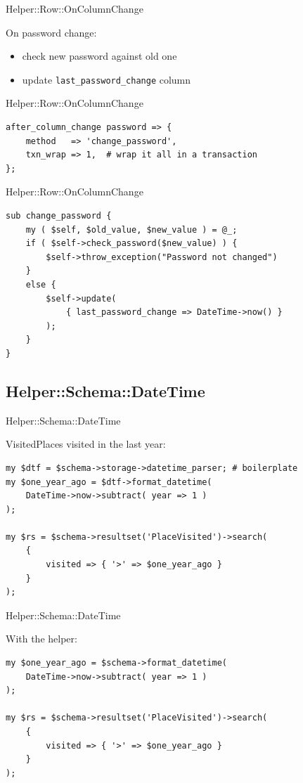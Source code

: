 \begin{frame}[fragile]{Helper::Row::OnColumnChange}

On password change:

\begin{itemize}
\item check new password against old one
\item update \verb|last_password_change| column
\end{itemize}

\end{frame}

\begin{frame}[fragile]{Helper::Row::OnColumnChange}
\begin{lstlisting}
after_column_change password => {
    method   => 'change_password',
    txn_wrap => 1,  # wrap it all in a transaction
};
\end{lstlisting}
\end{frame}

\begin{frame}[fragile]{Helper::Row::OnColumnChange}
\begin{lstlisting}
sub change_password {
    my ( $self, $old_value, $new_value ) = @_;
    if ( $self->check_password($new_value) ) {
        $self->throw_exception("Password not changed")
    }
    else {
        $self->update(
            { last_password_change => DateTime->now() }
        );
    }
}
\end{lstlisting}
\end{frame}

\subsection{Helper::Schema::DateTime}

\begin{frame}[fragile]{Helper::Schema::DateTime}

VisitedPlaces visited in the last year:

\begin{lstlisting}
my $dtf = $schema->storage->datetime_parser; # boilerplate
my $one_year_ago = $dtf->format_datetime(
    DateTime->now->subtract( year => 1 )
);

my $rs = $schema->resultset('PlaceVisited')->search(
    {
        visited => { '>' => $one_year_ago }
    }
);
\end{lstlisting}
\end{frame}

\begin{frame}[fragile]{Helper::Schema::DateTime}

With the helper:

\begin{lstlisting}
my $one_year_ago = $schema->format_datetime(
    DateTime->now->subtract( year => 1 )
);

my $rs = $schema->resultset('PlaceVisited')->search(
    {
        visited => { '>' => $one_year_ago }
    }
);
\end{lstlisting}
\end{frame}

